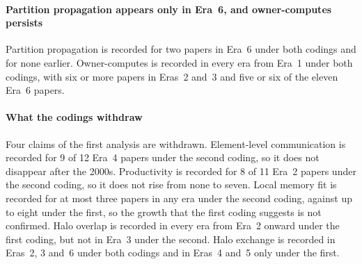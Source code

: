 \paragraph{Partition propagation appears only in Era~6, and owner-computes persists}
Partition propagation is recorded for two papers in Era~6 under both codings and for none earlier. Owner-computes is recorded in every era from Era~1 under both codings, with six or more papers in Eras~2 and~3 and five or six of the eleven Era~6 papers. 

\paragraph{What the codings withdraw}
Four claims of the first analysis are withdrawn. Element-level communication is recorded for 9 of 12 Era~4 papers under the second coding, so it does not disappear after the 2000s. Productivity is recorded for 8 of 11 Era~2 papers under the second coding, so it does not rise from none to seven. Local memory fit is recorded for at most three papers in any era under the second coding, against up to eight under the first, so the growth that the first coding suggests is not confirmed. Halo overlap is recorded in every era from Era~2 onward under the first coding, but not in Era~3 under the second. Halo exchange is recorded in Eras~2, 3 and~6 under both codings and in Eras~4 and~5 only under the first.

